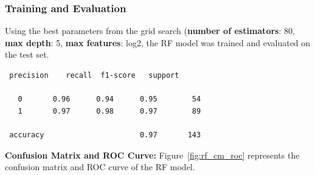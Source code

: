 \documentclass[12pt]{article}
\begin{document}
\subsubsection*{Training and Evaluation}
Using the best parameters from the grid search (\textbf{number of estimators}: 80, \textbf{max depth}: 5, \textbf{max features}: log2, the RF model was trained and evaluated on the test set.
\begin{verbatim}
 precision    recall  f1-score   support

   0       0.96      0.94      0.95        54
   1       0.97      0.98      0.97        89

 accuracy                      0.97       143
\end{verbatim}
\textbf{Confusion Matrix and ROC Curve:} Figure~\ref{fig:rf_cm_roc} represents the confusion matrix and ROC curve of the RF model.
\end{document}
